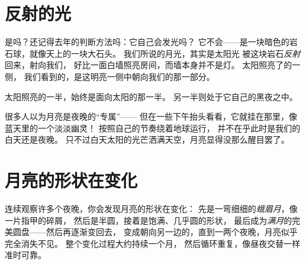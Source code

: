 \section{反射的光}

\begin{example}[月光是反射的太阳光]\label{ex:g2:moon-in-the-sky:borrowed}
是吗？还记得去年的判断方法吗：它自己会发光吗？
它不会——是一块暗色的岩石球，就像天上的一块大石头。
我们所说的月光，其实是太阳光
被这块岩石\emph{反射}回来，射向我们，
好比一面白墙照亮房间，而墙本身并不是灯。
太阳照亮了的一侧，
我们看到的，是这明亮一侧中朝向我们的那一部分。
\end{example}

\begin{omfigure}

{\small 太阳照亮的一半，始终是面向太阳的那一半。
另一半则处于它自己的黑夜之中。}
\end{omfigure}

\begin{remark}[白天的月亮]\label{rem:g2:moon-in-the-sky:daytime}
很多人以为月亮是夜晚的“专属”——
但在一些下午抬头看看，它就挂在那里，像蓝天里的一个淡淡幽灵！
按照自己的节奏绕着地球运行，
并不在乎此时是我们的白天还是夜晚。
只不过白天太阳的光芒洒满天空，月亮显得没那么醒目罢了。
\end{remark}

\section{月亮的形状在变化}

\begin{example}[月亮的形状变化]\label{ex:g2:moon-in-the-sky:shapes}
连续观察许多个夜晚，你会发现月亮的形状在变化：
先是一弯细细的\emph{蛾眉月}，像一片指甲的碎屑，
然后是半圆，接着是饱满、几乎圆的形状，
最后成为\emph{满月}的完美圆盘——然后再逐渐变回去，
变成朝向另一边的，直到一两个夜晚，月亮似乎完全消失不见。
整个变化过程大约持续一个月，
然后循环重复，像昼夜交替一样准时可靠。
\end{example}

